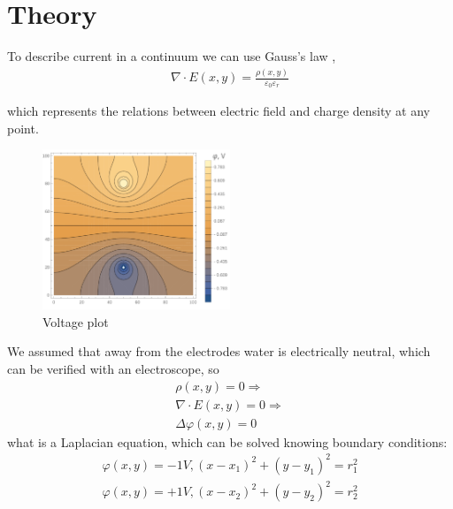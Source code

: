 \documentclass{article}
\begin{document}
\section{Theory}

To describe current in a continuum we can use Gauss's law \cite{gauss}, \cite{landavshic} 
\begin{equation}
  \begin{aligned}
  \nabla\cdot E (x, y) = \frac{\rho (x, y)}{\varepsilon_0 \varepsilon_r}
  \end{aligned}
\end{equation}
	  
   which represents the relations between electric field and charge density at any point. \par

\begin{figure}[h]
    \centering
    \includegraphics[width=0.5\textwidth]{theory plot.pdf}
    \caption{Voltage plot}
    \label{fig:mesh3}
\end{figure}

We assumed that away from the electrodes water is electrically neutral, which can be verified with an electroscope, so
\begin{equation}
  \begin{aligned}
    \rho (x, y) = 0 \Rightarrow\\
  	\nabla \cdot E (x, y) = 0 \Rightarrow \\
    \Delta \varphi (x, y) = 0 
  \end{aligned}
\end{equation}
what is a Laplacian equation, which can be solved knowing boundary conditions:
\begin{equation}
  \begin{aligned}
    \varphi (x, y) = -1 V, (x - x_1)^2 + (y - y_1)^2 = r_1^2 \\
    \varphi (x, y) = +1 V, (x - x_2)^2 + (y - y_2)^2 = r_2^2
  \end{aligned}
\end{equation}
\end{document}
